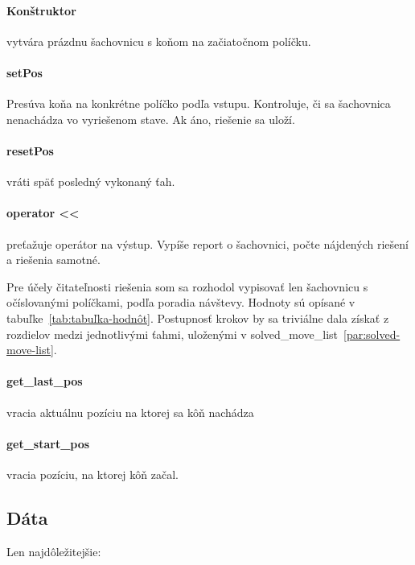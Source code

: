 \paragraph{Konštruktor} vytvára prázdnu šachovnicu s koňom na začiatočnom
políčku.

\paragraph{setPos} Presúva koňa na konkrétne políčko podľa vstupu.
Kontroluje, či sa šachovnica nenachádza vo vyriešenom stave.
Ak áno, riešenie sa uloží.

\paragraph{resetPos} vráti späť posledný vykonaný ťah.

\paragraph{operator <<} preťažuje operátor na výstup.
Vypíše report o šachovnici, počte nájdených riešení a riešenia samotné.

Pre účely čitateľnosti riešenia som sa rozhodol vypisovať len šachovnicu
s očíslovanými políčkami, podľa poradia návštevy.
Hodnoty sú opísané v tabuľke~\ref{tab:tabuľka-hodnôt}.
Postupnosť krokov by sa triviálne dala získať z rozdielov medzi jednotlivými ťahmi,
uloženými v solved\_move\_list~\ref{par:solved-move-list}.

\paragraph{get\_last\_pos} vracia aktuálnu pozíciu na ktorej sa kôň nachádza

\paragraph{get\_start\_pos} vracia pozíciu, na ktorej kôň začal.

\subsection{Dáta}\label{subsec:dáta}
Len najdôležitejšie:

